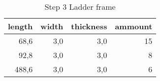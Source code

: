 \begin{table}[h!]
\centering
\caption{Step 3 Ladder frame}
\begin{tabular}{rrrr}
\toprule
 length &  width &  thickness &  ammount \\
\midrule
   68,6 &    3,0 &        3,0 &       15 \\
   92,8 &    3,0 &        3,0 &        8 \\
  488,6 &    3,0 &        3,0 &        6 \\
\bottomrule
\end{tabular}
\end{table}
